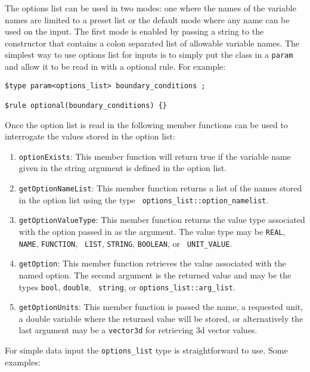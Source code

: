 The options list can be used in two modes: one where the names of the
variable names are limited to a preset list or the default mode where
any name can be used on the input. The first mode is enabled by
passing a string to the constructor that contains a colon separated
list of allowable variable names.   The simplest way to use options
list for inputs is to simply put the class in a {\tt param} and allow it to
be read in with a optional rule.  For example:

\begin{verbatim}
$type param<options_list> boundary_conditions ;

$rule optional(boundary_conditions) {}
\end{verbatim}

Once the option list is read in the following member functions can be
used to interrogate the values stored in the option list:
\begin{enumerate}
\item {\tt optionExists}: This member function will return true if the
  variable name given in the string argument is defined in the option
  list.
\item {\tt getOptionNameList}: This member function returns a list of
  the names stored in the option list using the type {\tt
    options\_list::option\_namelist}.
\item {\tt getOptionValueType}: This member function returns the value
  type associated with the option passed in as the argument.  The
  value type may be {\tt REAL}, {\tt NAME}, {\tt FUNCTION}, {\tt
    LIST},  {\tt STRING}, {\tt BOOLEAN}, or {\tt
    UNIT\_VALUE}. 
\item {\tt getOption}:  This member function retrieves the value
  associated with the named option. The second argument is the
  returned value and may be the types {\tt bool}, {\tt double}, {\tt
    string}, or {\tt options\_list::arg\_list}.
\item {\tt getOptionUnits}: This member function is passed the name, a
  requested unit, a double variable where the returned value will be
  stored, or alternatively the last argument may be a {\tt vector3d}
  for retrieving 3d vector values.
\end{enumerate}

For simple data input the {\tt options\_list} type is straightforward
to use.  Some examples:

